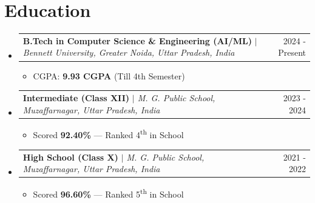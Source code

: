 \documentclass[9.5pt,letterpaper]{article}
\makeatletter
\newcommand{\resumeItem}[1]{%
  \item\small{#1\vspace{-1pt}}%
}
\newenvironment{resumeList}{%
  \begin{itemize}[
    leftmargin=0.18in,
    label=\textbullet,
    itemsep=1pt,
    topsep=3pt,
    parsep=0pt
  ]%
}{%
  \end{itemize}\vspace{-2pt}%
}
\newenvironment{outerList}{%
  \begin{itemize}[leftmargin=0pt, label={}, itemsep=0pt, topsep=0pt, parsep=0pt]%
}{%
  \end{itemize}%
}
\newcommand{\eduEntry}[3]{%
  \item[]
  \begin{tabularx}{\linewidth}{@{}X r@{}}
    \textbf{#1} \textit{\small $|$ #2} & \small #3
  \end{tabularx}\vspace{1pt}
}
\makeatother
\begin{document}
\vspace{2pt}
\section{Education}
\begin{outerList}

  \eduEntry{B.Tech in Computer Science \& Engineering (AI/ML)}{Bennett University, Greater Noida, Uttar Pradesh, India}{2024 - Present}
  \vspace{-15pt}
  \begin{resumeList}
    \resumeItem{CGPA: \textbf{9.93 CGPA} (Till 4th Semester)}
  \end{resumeList}
\vspace{5pt}
  \eduEntry{Intermediate (Class XII)}{M. G. Public School, Muzaffarnagar, Uttar Pradesh, India}{2023 - 2024}
  \vspace{-15pt}
  \begin{resumeList}
    \resumeItem{Scored \textbf{92.40\%} — Ranked 4\textsuperscript{th} in School}
  \end{resumeList}
\vspace{5pt}
  \eduEntry{High School (Class X)}{M. G. Public School, Muzaffarnagar, Uttar Pradesh, India}{2021 - 2022}
  \vspace{-15pt}
  \begin{resumeList}
    \resumeItem{Scored \textbf{96.60\%} — Ranked 5\textsuperscript{th} in School}
  \end{resumeList}

\end{outerList}
\end{document}
